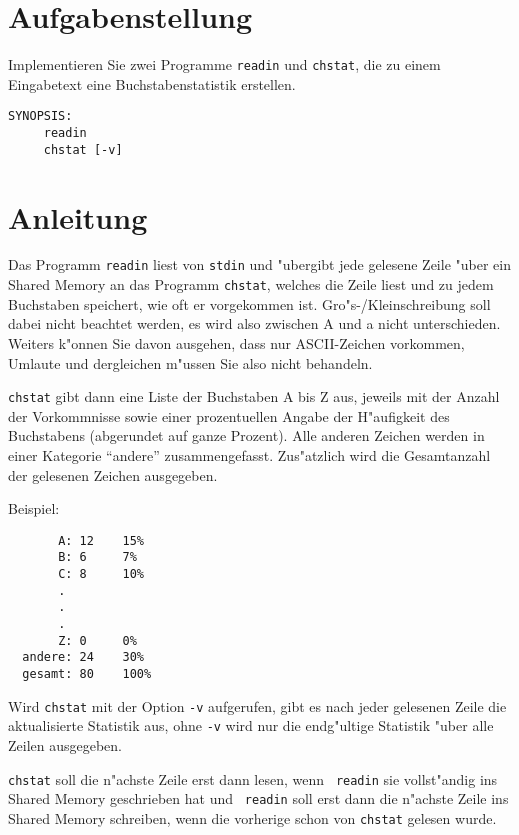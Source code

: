 




\section*{Aufgabenstellung}

Implementieren Sie zwei Programme {\tt readin} und {\tt chstat}, die
zu einem Eingabetext eine Buchstabenstatistik erstellen.

\begin{verbatim}
SYNOPSIS:
     readin
     chstat [-v]
\end{verbatim} 




\section*{Anleitung}

Das Programm {\tt readin} liest von {\tt stdin} und "ubergibt jede
gelesene Zeile "uber ein Shared Memory an das Programm {\tt chstat},
welches die Zeile liest und zu jedem Buchstaben speichert, wie oft er
vorgekommen ist. Gro"s-/Kleinschreibung soll dabei nicht beachtet
werden, es wird also zwischen A und a nicht unterschieden. Weiters
k"onnen Sie davon ausgehen, dass nur ASCII-Zeichen vorkommen, Umlaute
und dergleichen m"ussen Sie also nicht behandeln.

{\tt chstat} gibt dann eine Liste der Buchstaben A bis Z aus, jeweils
mit der Anzahl der Vorkommnisse sowie einer prozentuellen Angabe der
H"aufigkeit des Buchstabens (abgerundet auf ganze Prozent). Alle
anderen Zeichen werden in einer Kategorie ``andere''
zusammengefasst. Zus"atzlich wird die Gesamtanzahl der gelesenen
Zeichen ausgegeben.

Beispiel:
\begin{verbatim}
       A: 12    15%
       B: 6     7%
       C: 8     10%
       .
       .
       .
       Z: 0     0%
  andere: 24    30%
  gesamt: 80    100%
\end{verbatim}

Wird {\tt chstat} mit der Option {\tt -v} aufgerufen, gibt es nach
jeder gelesenen Zeile die aktualisierte Statistik aus, ohne {\tt -v}
wird nur die endg"ultige Statistik "uber alle Zeilen ausgegeben.

{\tt chstat} soll die n"achste Zeile erst dann lesen, wenn {\tt
readin} sie vollst"andig ins Shared Memory geschrieben hat und {\tt
readin} soll erst dann die n"achste Zeile ins Shared Memory schreiben,
wenn die vorherige schon von {\tt chstat} gelesen wurde.

